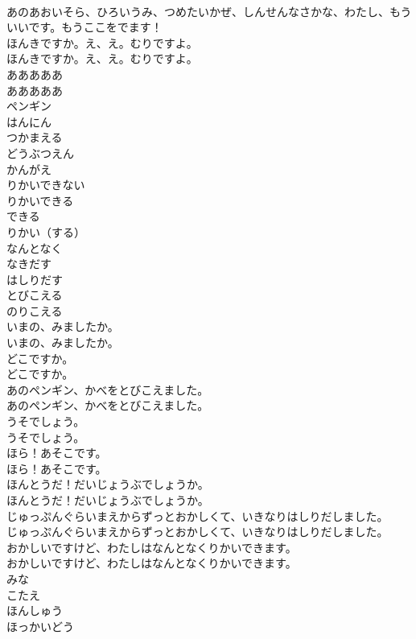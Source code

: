\documentclass[8pt]{extreport}
\begin{document}
\begin{CJK}{UTF8}{min}
\\	あのあおいそら、ひろいうみ、つめたいかぜ、しんせんなさかな、わたし、もういいです。もうここをでます！ 
\\	ほんきですか。え、え。むりですよ。	
\\	ほんきですか。え、え。むりですよ。 
\\	あああああ	
\\	あああああ　 
\\	ペンギン
\\	はんにん
\\	つかまえる
\\	どうぶつえん
\\	かんがえ
\\	りかいできない
\\	りかいできる
\\	できる
\\	りかい（する）
\\	なんとなく
\\	なきだす
\\	はしりだす
\\	とびこえる
\\	のりこえる
\\	いまの、みましたか。	
\\	いまの、みましたか。 
\\	どこですか。	
\\	どこですか。 
\\	あのペンギン、かべをとびこえました。	
\\	あのペンギン、かべをとびこえました。 
\\	うそでしょう。	
\\	うそでしょう。 
\\	ほら！あそこです。	
\\	ほら！あそこです。 
\\	ほんとうだ！だいじょうぶでしょうか。	
\\	ほんとうだ！だいじょうぶでしょうか。 
\\	じゅっぷんぐらいまえからずっとおかしくて、いきなりはしりだしました。	
\\	じゅっぷんぐらいまえからずっとおかしくて、いきなりはしりだしました。 
\\	おかしいですけど、わたしはなんとなくりかいできます。	
\\	おかしいですけど、わたしはなんとなくりかいできます。 
\\	みな
\\	こたえ
\\	ほんしゅう
\\	ほっかいどう

\end{CJK}
\end{document}
